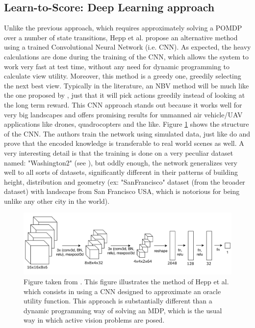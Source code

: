 \documentclass[a4paper,11pt,english]{article}
\begin{document}
\subsection{Learn-to-Score: Deep Learning approach}

Unlike the previous approach, which requires approximately solving a POMDP over a number of state transitions, Hepp et al. \cite{hepp2018learn} propose an alternative method using a trained Convolutional Neural Network (i.e. CNN). As expected, the heavy calculations are done during the training of the CNN, which allows the system to work very fast at test time, without any need for dynamic programming to calculate view utility. Moreover, this method is a greedy one, greedily selecting the next best view. Typically in the literature, an NBV method will be much like the one proposed by \cite{atanasov2014nonmyopic}, just that it will pick actions greedily instead of looking at the long term reward. This CNN approach stands out because it works well for very big landscapes and offers promising results for unmanned air vehicle/UAV applications like drones, quadrocopters and the like. Figure \ref{heppmethod1} shows the structure of the CNN. The authors train the network using simulated data, just like \cite{atanasov2014nonmyopic} do and prove that the encoded knowledge is transferable to real world scenes as well. A very interesting detail is that the training is done on a very peculiar dataset named: "Washington2" (see \cite{zamir2016generic}), but oddly enough, the network generalizes very well to all sorts of datasets, significantly different in their patterns of building height, distribution and geometry (ex: "SanFrancisco" dataset (from the broader \cite{zamir2016generic} dataset) with landscape from San Francisco USA, which is notorious for being unlike any other city in the world).  
\begin{figure}[t!]
  
  \centering
    \includegraphics[scale=0.13]{heppmethod1_highres.jpg}
    \caption{Figure taken from \cite{hepp2018learn}.
  This figure illustrates the method of Hepp et al. \cite{hepp2018learn} which consists in using a CNN designed to approximate an oracle utility function. This approach is substantially different than a dynamic programming way of solving an MDP, which is the usual way in which active vision problems are posed.}
  \label{heppmethod1}
\end{figure}
\end{document}
